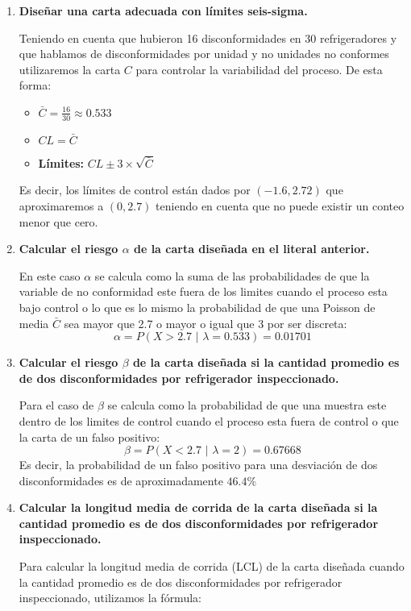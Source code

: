 \documentclass{article}
\begin{document}
\begin{enumerate}[label = \textbf{\alph*)}]
    \item \textbf{Diseñar una carta adecuada con límites seis-sigma.}

    Teniendo en cuenta que hubieron 16 disconformidades en 30 refrigeradores y que hablamos de disconformidades por unidad y no unidades no conformes utilizaremos la carta $C$ para controlar la variabilidad del proceso. De esta forma: 
    \begin{itemize}
        \item $\bar{C} = \frac{16}{30} \approx 0.533$
        \item $CL = \bar{C}$
        \item \textbf{Límites:} $CL \pm 3 \times \sqrt{\bar{C}}$
    \end{itemize}

    Es decir, los límites de control están dados por $(-1.6, 2.72)$ que aproximaremos a $(0,2.7)$ teniendo en cuenta que no puede existir un conteo menor que cero.
    
    \item \textbf{Calcular el riesgo $\alpha$ de la carta diseñada en el literal anterior.}

    En este caso $\alpha$ se calcula como la suma de las probabilidades de que la variable de no conformidad este fuera de los limites cuando el proceso esta bajo control o lo que es lo mismo la probabilidad de que una Poisson de media $\bar{C}$ sea mayor que 2.7 o mayor o igual que 3 por ser discreta: $$\alpha=P(X > 2.7 \,\, | \,\, \lambda = 0.533) = 0.01701$$ 
    
    \item \textbf{Calcular el riesgo $\beta$ de la carta diseñada si la cantidad promedio es de dos disconformidades por refrigerador inspeccionado.}

    Para el caso de $\beta$ se calcula como la probabilidad de que una muestra este dentro de los limites de control cuando el proceso esta fuera de control o que la carta de un falso positivo: $$\beta=P(X < 2.7 \,\, | \,\, \lambda = 2) = 0.67668$$ 
    Es decir, la probabilidad de un falso positivo para una desviación de dos disconformidades es de aproximadamente $46.4\%$  
    
    \item \textbf{Calcular la longitud media de corrida de la carta diseñada si la cantidad promedio es de dos disconformidades por refrigerador inspeccionado.}

    Para calcular la longitud media de corrida (LCL) de la carta diseñada cuando la cantidad promedio es de dos disconformidades por refrigerador inspeccionado, utilizamos la fórmula:


\end{enumerate}
\end{document}
